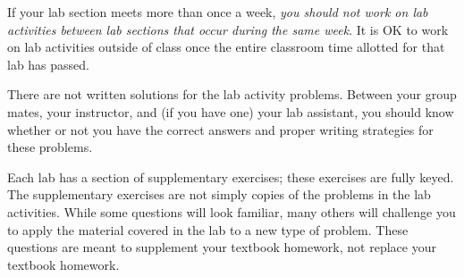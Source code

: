 \documentclass[12pt,draft,]{article}
\theoremstyle{plain}
\theoremstyle{definition}
\begin{document}
%
\par If your lab section meets more than once a week, \emph{you should not work on lab activities between
            lab sections that occur during the same week}. It is OK to work on lab activities outside of class
            once the entire classroom time allotted for that lab has passed.
%
\par There are not written solutions for the lab activity problems. Between your group mates, your
            instructor, and (if you have one) your lab assistant, you should know whether or not you have the
            correct answers and proper writing strategies for these problems.
%
\par Each lab has a section of supplementary exercises; these exercises are fully keyed. The
            supplementary exercises are not simply copies of the problems in the lab activities. While some
            questions will look familiar, many others will challenge you to apply the material covered in the lab
            to a new type of problem. These questions are meant to supplement your textbook homework, not
            replace your textbook homework.
%
\typeout{************************************************}
\typeout{************************************************}
%
\end{document}
